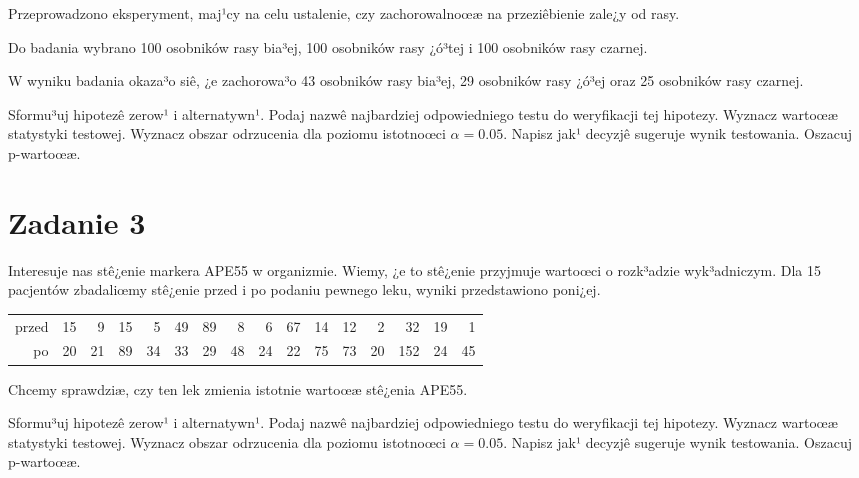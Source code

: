 \documentclass[a4paper,12pt]{article}
\begin{document}
  Przeprowadzono eksperyment, maj¹cy na celu ustalenie, czy zachorowalnoœæ na przeziêbienie zale¿y od rasy.
  
  Do badania wybrano 100 osobników rasy bia³ej, 100 osobników rasy ¿ó³tej i 100 osobników rasy czarnej. 
  
  W wyniku badania okaza³o siê, ¿e zachorowa³o 43 osobników rasy bia³ej, 29 osobników rasy ¿ó³ej oraz 25 osobników rasy czarnej. 
  
  Sformu³uj hipotezê zerow¹ i alternatywn¹. 
  Podaj nazwê najbardziej odpowiedniego testu do weryfikacji tej hipotezy. 
  Wyznacz wartoœæ statystyki testowej. 
  Wyznacz obszar odrzucenia dla poziomu istotnoœci $\alpha=0.05$. 
  Napisz jak¹ decyzjê sugeruje wynik testowania. Oszacuj p-wartoœæ. \vspace{1cm} 

  \section*{Zadanie 3}
     
  Interesuje nas stê¿enie markera APE55  w organizmie. 
  Wiemy, ¿e to stê¿enie przyjmuje wartoœci o rozk³adzie wyk³adniczym. 
  Dla 15 pacjentów zbadaliœmy stê¿enie przed i po podaniu pewnego leku, 
  wyniki przedstawiono poni¿ej.
  
  \vspace{0.5cm} 
  \noindent\begin{center} 
\begin{tabular}{rrrrrrrrrrrrrrrr}
  \hline
  \hline
przed & 15 & 9 & 15 & 5 & 49 & 89 & 8 & 6 & 67 & 14 & 12 & 2 & 32 & 19 & 1 \\
  po & 20 & 21 & 89 & 34 & 33 & 29 & 48 & 24 & 22 & 75 & 73 & 20 & 152 & 24 & 45 \\
   \hline
\end{tabular}
 
  \end{center} 
  \vspace{0.5cm}
  
  Chcemy sprawdziæ, czy ten lek zmienia istotnie wartoœæ stê¿enia APE55.
  
  Sformu³uj hipotezê zerow¹ i alternatywn¹. 
  Podaj nazwê najbardziej odpowiedniego testu do weryfikacji tej hipotezy. 
  Wyznacz wartoœæ statystyki testowej. 
  Wyznacz obszar odrzucenia dla poziomu istotnoœci $\alpha=0.05$. 
  Napisz jak¹ decyzjê sugeruje wynik testowania. Oszacuj p-wartoœæ. \vspace{1cm} 
\end{document}
